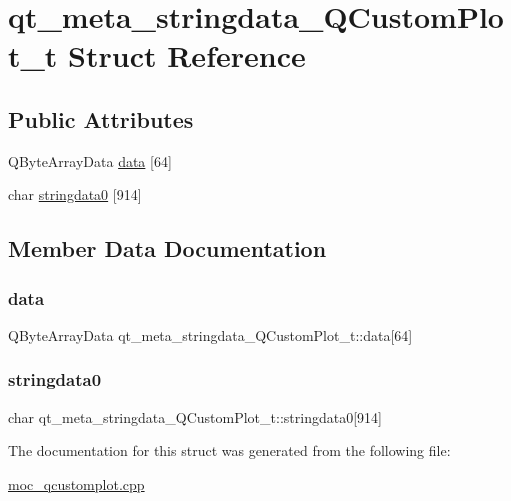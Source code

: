 \hypertarget{structqt__meta__stringdata__QCustomPlot__t}{}\section{qt\+\_\+meta\+\_\+stringdata\+\_\+\+Q\+Custom\+Plot\+\_\+t Struct Reference}
\label{structqt__meta__stringdata__QCustomPlot__t}
\subsection*{Public Attributes}
\begin{DoxyCompactItemize}
\item 
Q\+Byte\+Array\+Data \mbox{\hyperlink{structqt__meta__stringdata__QCustomPlot__t_a8977178dafbbe5777e63d644f3bf262a}{data}} \mbox{[}64\mbox{]}
\item 
char \mbox{\hyperlink{structqt__meta__stringdata__QCustomPlot__t_ad63fb62139acbe99179838dc5bd42bbb}{stringdata0}} \mbox{[}914\mbox{]}
\end{DoxyCompactItemize}


\subsection{Member Data Documentation}
\mbox{\label{structqt__meta__stringdata__QCustomPlot__t_a8977178dafbbe5777e63d644f3bf262a}} 
\subsubsection{\texorpdfstring{data}{data}}
{\footnotesize\ttfamily Q\+Byte\+Array\+Data qt\+\_\+meta\+\_\+stringdata\+\_\+\+Q\+Custom\+Plot\+\_\+t\+::data\mbox{[}64\mbox{]}}

\mbox{\label{structqt__meta__stringdata__QCustomPlot__t_ad63fb62139acbe99179838dc5bd42bbb}} 
\subsubsection{\texorpdfstring{stringdata0}{stringdata0}}
{\footnotesize\ttfamily char qt\+\_\+meta\+\_\+stringdata\+\_\+\+Q\+Custom\+Plot\+\_\+t\+::stringdata0\mbox{[}914\mbox{]}}



The documentation for this struct was generated from the following file\+:\begin{DoxyCompactItemize}
\item 
\mbox{\hyperlink{moc__qcustomplot_8cpp}{moc\+\_\+qcustomplot.\+cpp}}\end{DoxyCompactItemize}
